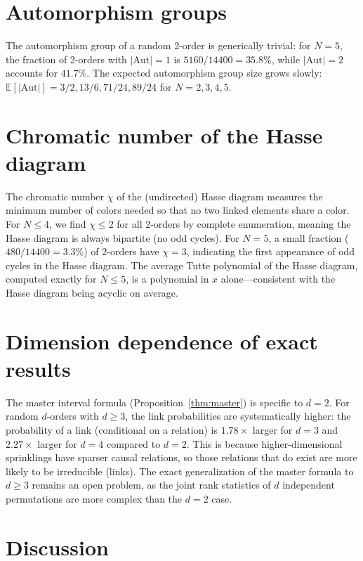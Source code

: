 \documentclass[aps,prd,twocolumn,superscriptaddress,nofootinbib]{revtex4-2}
\begin{document}
\section{Automorphism groups}

The automorphism group of a random 2-order is generically trivial: for $N = 5$, the fraction of 2-orders with $|\mathrm{Aut}| = 1$ is $5160/14400 = 35.8\%$, while $|\mathrm{Aut}| = 2$ accounts for $41.7\%$. The expected automorphism group size grows slowly: $\mathbb{E}[|\mathrm{Aut}|] = 3/2, 13/6, 71/24, 89/24$ for $N = 2, 3, 4, 5$.

\section{Chromatic number of the Hasse diagram}

The chromatic number $\chi$ of the (undirected) Hasse diagram measures the minimum number of colors needed so that no two linked elements share a color. For $N \leq 4$, we find $\chi \leq 2$ for all 2-orders by complete enumeration, meaning the Hasse diagram is always bipartite (no odd cycles). For $N = 5$, a small fraction ($480/14400 = 3.3\%$) of 2-orders have $\chi = 3$, indicating the first appearance of odd cycles in the Hasse diagram. The average Tutte polynomial of the Hasse diagram, computed exactly for $N \leq 5$, is a polynomial in $x$ alone---consistent with the Hasse diagram being acyclic on average.

\section{Dimension dependence of exact results}

The master interval formula (Proposition~\ref{thm:master}) is specific to $d = 2$. For random $d$-orders with $d \geq 3$, the link probabilities are systematically higher: the probability of a link (conditional on a relation) is $1.78\times$ larger for $d = 3$ and $2.27\times$ larger for $d = 4$ compared to $d = 2$. This is because higher-dimensional sprinklings have sparser causal relations, so those relations that do exist are more likely to be irreducible (links). The exact generalization of the master formula to $d \geq 3$ remains an open problem, as the joint rank statistics of $d$ independent permutations are more complex than the $d = 2$ case.

\section{Discussion}
\end{document}
